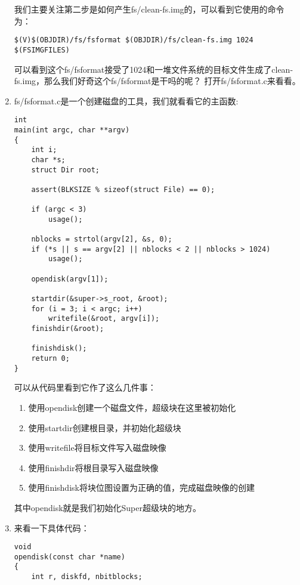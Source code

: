 \documentclass{article}
\begin{document}
\begin{CJK*}{UTF8}{gkai}
\begin{enumerate}
{我们主要关注第二步是如何产生fs/clean-fs.img的，可以看到它使用的命令为：

\begin{lstlisting}[style=mcode, firstnumber=41, title={\scriptsize \ttfamily \bfseries fs/Makefrag}]
$(V)$(OBJDIR)/fs/fsformat $(OBJDIR)/fs/clean-fs.img 1024 $(FSIMGFILES)
\end{lstlisting}

可以看到这个fs/fsformat接受了1024和一堆文件系统的目标文件生成了clean-fs.img，那么我们好奇这个fs/fsformat是干吗的呢？ 打开fs/fsformat.c来看看。
}

\item{fs/fsformat.c是一个创建磁盘的工具，我们就看看它的主函数:

\begin{lstlisting}[style=ccode, title={\scriptsize \ttfamily \bfseries fs/fsformat.c: main()}]
int
main(int argc, char **argv)
{
	int i;
	char *s;
	struct Dir root;

	assert(BLKSIZE % sizeof(struct File) == 0);

	if (argc < 3)
		usage();

	nblocks = strtol(argv[2], &s, 0);
	if (*s || s == argv[2] || nblocks < 2 || nblocks > 1024)
		usage();

	opendisk(argv[1]);

	startdir(&super->s_root, &root);
	for (i = 3; i < argc; i++)
		writefile(&root, argv[i]);
	finishdir(&root);

	finishdisk();
	return 0;
}
\end{lstlisting}

可以从代码里看到它作了这么几件事：

\begin{enumerate}
\item{使用opendisk创建一个磁盘文件，超级块在这里被初始化}
\item{使用startdir创建根目录，并初始化超级块}
\item{使用writefile将目标文件写入磁盘映像}
\item{使用finishdir将根目录写入磁盘映像}
\item{使用finishdisk将块位图设置为正确的值，完成磁盘映像的创建}
\end{enumerate}

其中opendisk就是我们初始化Super超级块的地方。

}
\item{来看一下具体代码：
\begin{lstlisting}[style=ccode, title={\scriptsize \ttfamily \bfseries fs/fsformat.c: opendisk()}]
void
opendisk(const char *name)
{
	int r, diskfd, nbitblocks;


\end{lstlisting}}
\end{enumerate}
\end{CJK*}
\end{document}
